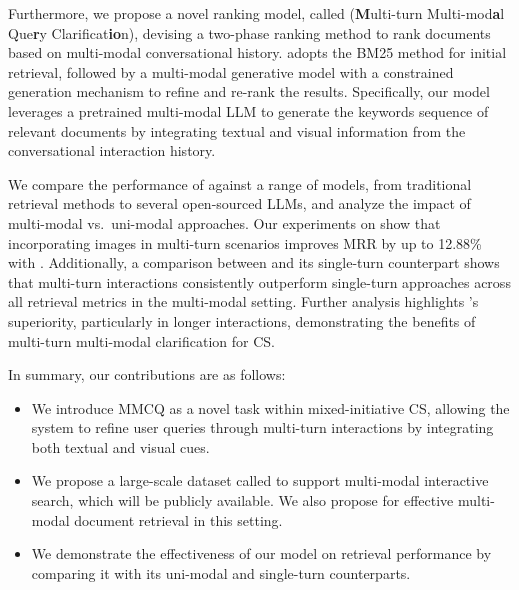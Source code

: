 \documentclass[11pt]{article}
\begin{document}
 


Furthermore, we propose a novel ranking model, called \OurModel{} (\textbf{M}ulti-turn Multi-mod\textbf{a}l Que\textbf{r}y Clarificat\textbf{io}n), devising a two-phase ranking method to rank documents based on multi-modal conversational history. \OurModel adopts the BM25 method for initial retrieval, followed by a multi-modal generative model with a constrained generation mechanism to refine and re-rank the results. Specifically, our model leverages a pretrained multi-modal \ac{LLM} to generate the keywords sequence of relevant documents by integrating textual and visual information from the conversational interaction history.

We compare the performance of \OurModel{} against a range of models, from traditional retrieval methods to several open-sourced LLMs, and analyze the impact of multi-modal vs.\ uni-modal approaches. 
Our experiments on \OurData{} show that incorporating images in multi-turn scenarios improves MRR by up to 12.88\%  with \OurModel{}.
Additionally, a comparison between \OurData{} and its single-turn counterpart shows that multi-turn interactions consistently outperform single-turn approaches across all retrieval metrics in the multi-modal setting. Further analysis highlights \OurModel{}'s superiority, particularly in longer interactions, demonstrating the benefits of multi-turn multi-modal clarification for \ac{CS}.

\noindent
In summary, our contributions are as follows:
\begin{itemize}
    \item We introduce MMCQ as a novel task within mixed-initiative \ac{CS}, allowing the system to refine user queries through multi-turn interactions by integrating both textual and visual cues.
    \item We propose a large-scale dataset called \OurData{} to support multi-modal interactive search, which will be publicly available. We also propose \OurModel{} for effective multi-modal document retrieval in this setting. 
    \item We demonstrate the effectiveness of our model on retrieval performance by comparing it with its uni-modal and single-turn counterparts. 
\end{itemize}
\end{document}
